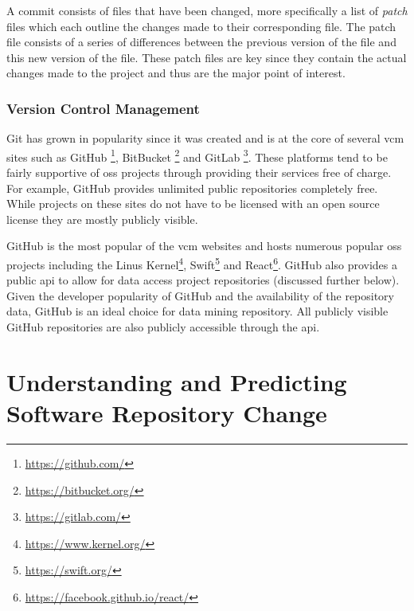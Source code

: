 A commit consists of files that have been changed, more specifically a list of \textit{patch} files which each outline the changes made to their corresponding file. The patch file consists of a series of differences between the previous version of the file and this new version of the file. These patch files are key since they contain the actual changes made to the project and thus are the major point of interest.


\subsubsection{Version Control Management}
Git has grown in popularity since it was created and is at the core of several \gls{vcm} sites such as GitHub \footnote{\url{https://github.com/}}, BitBucket \footnote{\url{https://bitbucket.org/}} and GitLab \footnote{\url{https://gitlab.com/}}. These platforms tend to be fairly supportive of \gls{oss} projects through providing their services free of charge. For example, GitHub provides unlimited public repositories completely free. While projects on these sites do not have to be licensed with an open source license they are mostly publicly visible.


GitHub is the most popular of the \gls{vcm} websites and hosts numerous popular \gls{oss} projects including the Linus Kernel\footnote{\url{https://www.kernel.org/}}, Swift\footnote{\url{https://swift.org/}} and React\footnote{\url{https://facebook.github.io/react/}}. GitHub also provides a public \gls{api} to allow for data access project repositories (discussed further below). Given the developer popularity of GitHub and the availability of the repository data, GitHub is an ideal choice for data mining repository. All publicly visible GitHub repositories are also publicly accessible through the \gls{api}.

\section{Understanding and Predicting Software Repository Change}


